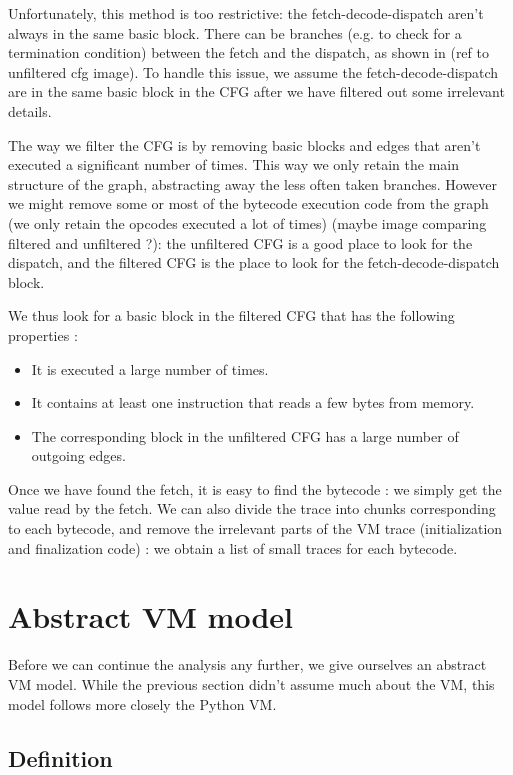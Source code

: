 \documentclass[french]{article}
\begin{document}
Unfortunately, this method is too restrictive: the fetch-decode-dispatch aren't always in the same basic block. There can be branches (e.g. to check for a termination condition) between the fetch and the dispatch, as shown in (ref to unfiltered cfg image). To handle this issue, we assume the fetch-decode-dispatch are in the same basic block in the CFG after we have filtered out some irrelevant details. 

The way we filter the CFG is by removing basic blocks and edges that aren't executed a significant number of times. This way we only retain the main structure of the graph, abstracting away the less often taken branches. However we might remove some or most of the bytecode execution code from the graph (we only retain the opcodes executed a lot of times) (maybe image comparing filtered and unfiltered ?): the unfiltered CFG is a good place to look for the dispatch, and the filtered CFG is the place to look for the fetch-decode-dispatch block. 

We thus look for a basic block in the filtered CFG that has the following properties :
\begin{itemize}
	\item It is executed a large number of times.
	\item It contains at least one instruction that reads a few bytes from memory.
	\item The corresponding block in the unfiltered CFG has a large number of outgoing edges.
\end{itemize}

Once we have found the fetch, it is easy to find the bytecode : we simply get the value read by the fetch. We can also divide the trace into chunks corresponding to each bytecode, and remove the irrelevant parts of the VM trace (initialization and finalization code) : we obtain a list of small traces for each bytecode.

\section{Abstract VM model}

Before we can continue the analysis any further, we give ourselves an abstract VM model. While the previous section didn't assume much about the VM, this model follows more closely the Python VM.
\subsection{Definition}
\end{document}
